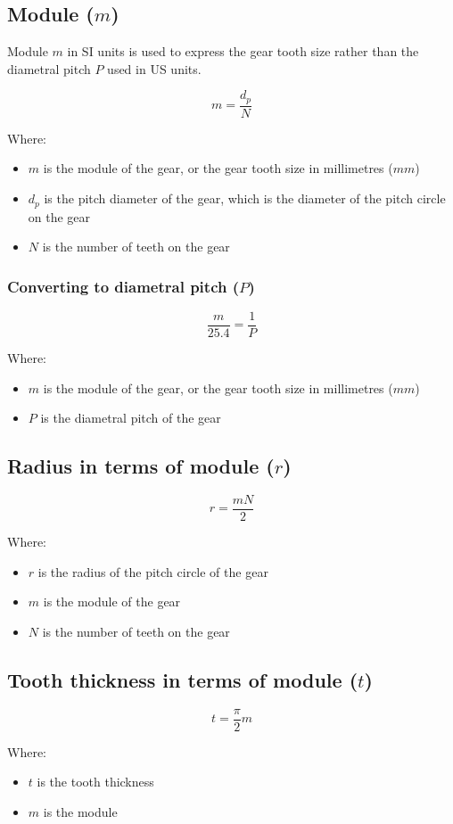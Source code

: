 \documentclass[11pt]{article}
\begin{document}
\subsection{Module (\(m\))}
\label{sec:org127d320}
Module \(m\) in SI units is used to express the gear tooth size rather than the diametral pitch \(P\) used in US units.

\[m = \frac{d_p}{N}\]

Where:
\begin{itemize}
\item \(m\) is the module of the gear, or the gear tooth size in millimetres (\(\unit{mm}\))
\item \(d_p\) is the pitch diameter of the gear, which is the diameter of the pitch circle on the gear
\item \(N\) is the number of teeth on the gear
\end{itemize}
\subsubsection{Converting to diametral pitch (\(P\))}
\label{sec:org7416cec}
\[\frac{m}{25.4} = \frac{1}{P}\]

Where:
\begin{itemize}
\item \(m\) is the module of the gear, or the gear tooth size in millimetres (\(\unit{mm}\))
\item \(P\) is the diametral pitch of the gear
\end{itemize}
\subsection{Radius in terms of module (\(r\))}
\label{sec:org994cf89}
\[r = \frac{mN}{2}\]

Where:
\begin{itemize}
\item \(r\) is the radius of the pitch circle of the gear
\item \(m\) is the module of the gear
\item \(N\) is the number of teeth on the gear
\end{itemize}
\subsection{Tooth thickness in terms of module (\(t\))}
\label{sec:orgf296a0a}
\[t = \frac{\pi}{2} m\]

Where:
\begin{itemize}
\item \(t\) is the tooth thickness
\item \(m\) is the module
\end{itemize}
\end{document}
